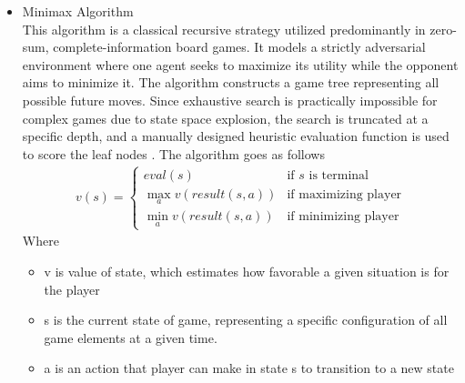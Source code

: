 \begin{itemize}
	\item Minimax Algorithm\\ This algorithm is a classical recursive strategy utilized predominantly in zero-sum, complete-information board games. It models a strictly adversarial environment where one agent seeks to maximize its utility while the opponent aims to minimize it. The algorithm constructs a game tree representing all possible future moves. Since exhaustive search is practically impossible for complex games due to state space explosion, the search is truncated at a specific depth, and a manually designed heuristic evaluation function is used to score the leaf nodes \cite{9533206}. The algorithm goes as follows 
	\begin{align}
	v(s) = 
	\begin{cases} 
		eval(s) & \text{if } s \text{ is terminal} \\
		\max_{a} v(result(s, a)) & \text{if maximizing player} \\
		\min_{a} v(result(s, a)) & \text{if minimizing player}
	\end{cases}
	\end{align}
		Where
	\begin{itemize}
		\item v is value of state, which estimates how favorable a given situation is for the player
		\item s is the current state of game, representing a specific configuration of all game elements at a given time.
		\item a is an action that player can make in state s to transition to a new state
	\end{itemize}
	

\end{itemize}

